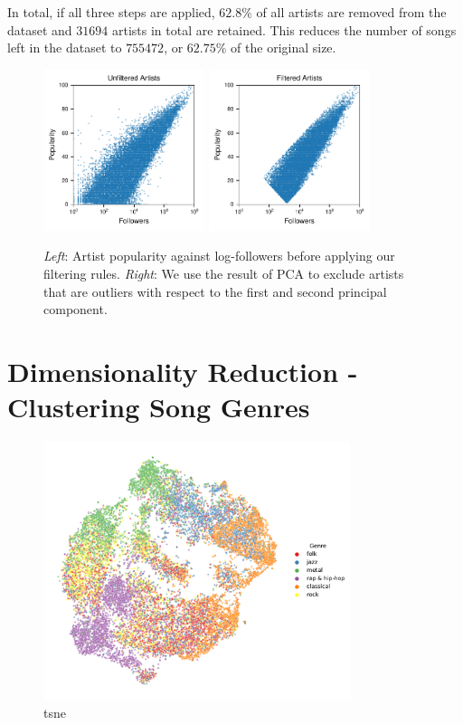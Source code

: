 \documentclass{article}
\begin{document}
In total, if all three steps are applied, $62.8\%$ of all artists are removed from the dataset and $31694$ artists in total are retained. This reduces the number of songs left in the dataset to $755472$, or $62.75\%$ of the original size.

\begin{figure}
  \centering
  \includegraphics[width=0.42\textwidth]{../figures/artists_unfiltered.pdf}
  \qquad
  \includegraphics[width=0.42\textwidth]{../figures/artists_filtered.pdf}
  \caption{\textit{Left}: Artist popularity against log-followers before applying our filtering rules. \textit{Right}: We use the result of PCA to exclude artists that are outliers with respect to the first and second principal component.}
  \label{fig:filtering}
\end{figure}

\section{Dimensionality Reduction - Clustering Song Genres}

\begin{figure}
  \centering
  \includegraphics[width=0.8\textwidth]{../figures/tsne_genres.pdf}
  \caption{tsne}
  \label{fig:tsne_genres}
\end{figure}
\end{document}
